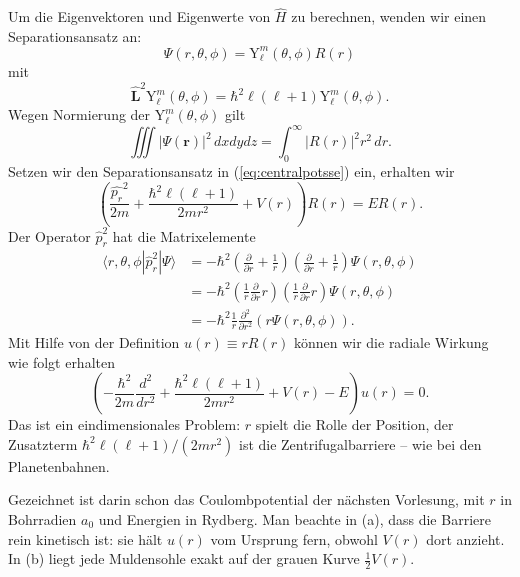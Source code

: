 Um die Eigenvektoren und Eigenwerte von $\widehat{H}$ zu berechnen, wenden wir einen Separationsansatz an:
\begin{equation}
	\Psi(r,\theta,\phi) = \text{Y}_{\ell}^m(\theta,\phi) R(r) 
\end{equation}
mit
\begin{equation}
	\widehat{\mathbf{L}}^2\text{Y}_{\ell}^m(\theta,\phi) = \hbar^2 \ell(\ell+1)\text{Y}_{\ell}^m(\theta,\phi).
\end{equation}
Wegen Normierung der $\text{Y}_{\ell}^m(\theta,\phi)$ gilt
\begin{equation}
	\iiint |\Psi(\mathbf{r})|^2\,dxdydz = \int_0^{\infty} |R(r)|^2 r^2\, dr.
\end{equation}
Setzen wir den Separationsansatz in (\ref{eq:centralpotsse}) ein, erhalten wir
\begin{equation}
	\left(\frac{\widehat{p_r}^2}{2m} + \frac{\hbar^2\ell(\ell+1)}{2mr^2} + V(r)\right)R(r) = E R(r).
\end{equation}
Der Operator $\widehat{p}_r^2$ hat die Matrixelemente 
\begin{equation}
	\begin{split}
		\langle r,\theta,\phi|\widehat{p}_r^2|\Psi\rangle &= -\hbar^2\left(\frac{\partial}{\partial r} + \frac{1}{r}\right)\left(\frac{\partial}{\partial r} + \frac{1}{r}\right)\Psi(r,\theta,\phi) \\
		&= -\hbar^2\left(\frac{1}{r}\frac{\partial}{\partial r} r\right)\left(\frac{1}{r}\frac{\partial}{\partial r} r\right)\Psi(r,\theta,\phi) \\ 
		&= -\hbar^2 \frac{1}{r}\frac{\partial^2}{\partial r^2}\left(r \Psi(r,\theta,\phi)\right).
	\end{split}
\end{equation}
Mit Hilfe von der Definition $u(r)\equiv rR(r)$ können wir die radiale Wirkung wie folgt erhalten
\begin{equation}
	\left(-\frac{\hbar^2}{2m}\frac{d^2}{dr^2} + \frac{\hbar^2\ell(\ell+1)}{2mr^2} + V(r) - E\right)u(r) = 0.
\end{equation}
Das ist ein eindimensionales Problem: $r$ spielt die Rolle der Position, der Zusatzterm $\hbar^2\ell(\ell+1)/(2mr^2)$ ist die Zentrifugalbarriere -- wie bei den Planetenbahnen.



Gezeichnet ist darin schon das Coulombpotential der nächsten Vorlesung, mit $r$
in Bohrradien $a_0$ und Energien in Rydberg. Man beachte in (a), dass die
Barriere rein kinetisch ist: sie hält $u(r)$ vom Ursprung fern, obwohl $V(r)$
dort anzieht. In (b) liegt jede Muldensohle exakt
auf der grauen Kurve $\tfrac12 V(r)$.

